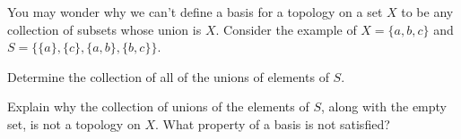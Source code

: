 
\be

\item You may wonder why we can't define a basis for a topology on a set $X$ to be any collection of subsets whose union is $X$. Consider the example of $X = \{a,b,c\}$ and $S = \{\{a\}, \{c\}, \{a,b\}, \{b,c\}\}$. 

\ba
\item Determine the collection of all of the unions of elements of $S$.

\item Explain why the collection of unions of the elements of $S$, along with the empty set, is not a topology on $X$. What property of a basis is not satisfied?

\ea

\begin{comment}

\ExerciseSolution

\ba

\item The collection of unions of elements of $S$ is 
\[\{\{a\}, \{c\}, \{a,b\}, \{b,c\}, \{a,b,c\}\}.\]

\item The set $\{\emptyset, \{a\}, \{c\}, \{a,b\}, \{b,c\}, \{a,b,c\}\}$ is not a topology on $X$ because it is not closed under finite intersections: $\{a,b\} \cap \{b,c\} = \{b\}$ is not in this set. So we have open sets $B_1 = \{a,b\}$ and $B_2 = \{b,c\}$ with $b \in B_1 \cap B_2$, but there is no element $B$ in this set with $b \in B$ and $B \subseteq B_1 \cap B_2$. 

\ea

\item For each integer $a$, let $a\Z = \{ka \mid k \in \Z\}$. That is, $a\Z$ is the set of all integer multiples of $a$.  

\ba

\item Show that $\{a\Z \mid a \in \Z\}$ is a basis for a topology $\tau$ on $\Z$. (Hint: What set is $m\Z \cap n\Z$?)

\item Is the set of positive integers an open set in the topological space $(\Z, \tau)$? Explain. 

\item Is the set of odd integers open in the topological space $(\Z, \tau)$? Explain.

\item Is the set $\{0\} \cup \{x \in Z \mid |x| \geq 5\}$ open in the topological space $(\Z, \tau)$? Explain.


\end{comment}
